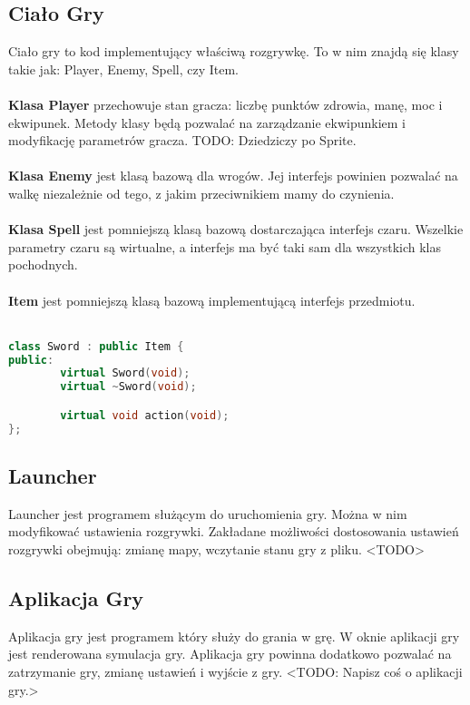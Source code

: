\documentclass[12pt, titlepage]{article}
\begin{document}
\subsection{Ciało Gry}
Ciało gry to kod implementujący właściwą
rozgrywkę. To w nim znajdą się klasy takie
jak: Player, Enemy, Spell, czy Item.
\\~\\
\textbf{Klasa Player} przechowuje
stan gracza: liczbę punktów zdrowia, manę,
moc i ekwipunek. Metody klasy
będą pozwalać na zarządzanie ekwipunkiem i
modyfikację parametrów gracza.
TODO: Dziedziczy po Sprite.
\\~\\
\textbf{Klasa Enemy} jest klasą bazową
dla wrogów. Jej interfejs powinien
pozwalać na walkę niezależnie od tego,
z jakim przeciwnikiem mamy do czynienia.
\\~\\
\textbf{Klasa Spell} jest pomniejszą
klasą
bazową dostarczająca interfejs czaru.
Wszelkie parametry czaru są wirtualne,
a interfejs ma być taki sam dla wszystkich
klas pochodnych.
\\~\\
\textbf{Item} jest pomniejszą klasą
bazową implementującą interfejs
przedmiotu.
\\~
\begin{lstlisting}[language=C++, caption=Klasa "`Sword"' - kod poglądowy]
class Sword : public Item {
public:
        virtual Sword(void);
        virtual ~Sword(void);

        virtual void action(void);
};
\end{lstlisting}

\subsection{Launcher}
Launcher jest programem służącym do uruchomienia gry.
Można w nim modyfikować ustawienia rozgrywki. Zakładane
możliwości dostosowania ustawień rozgrywki obejmują:
zmianę mapy, wczytanie stanu gry z pliku. <TODO>

\subsection{Aplikacja Gry}
Aplikacja gry jest programem który służy
do grania w grę. W oknie aplikacji gry jest
renderowana symulacja gry. Aplikacja gry
powinna dodatkowo pozwalać na zatrzymanie
gry, zmianę ustawień i wyjście z gry. <TODO:
Napisz coś o aplikacji gry.>
\end{document}
